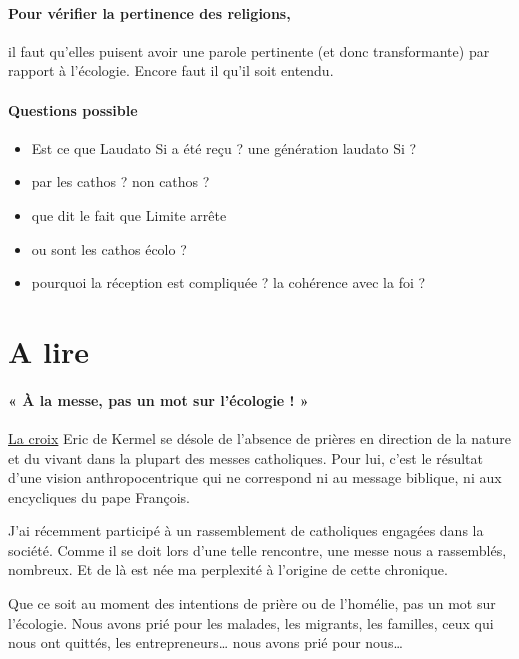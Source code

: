 \paragraph{Pour vérifier la pertinence des religions, } il faut qu'elles puisent avoir une parole pertinente (et donc transformante) par rapport à l'écologie. Encore faut il qu'il soit entendu.

\paragraph{Questions possible}
\begin{itemize}
    \item Est ce que Laudato Si a été reçu ? une génération laudato Si ?
    \item par les cathos ? non cathos ?
    \item que dit le fait que Limite arrête
    \item ou sont les cathos écolo ?
    \item pourquoi la réception est compliquée ? la cohérence avec la foi ? 
\end{itemize}



\section{A lire}

\paragraph{« À la messe, pas un mot sur l’écologie ! »}
\href{https://www.la-croix.com/Debats/A-messe-pas-mot-lecologie-2022-11-13-1201241840?utm_source=newsletter&utm_medium=email&utm_campaign=NEWSLETTER__CRX_REL_EDITO&utm_content=20221114}{La croix}
Eric de Kermel se désole de l’absence de prières en direction de la nature et du vivant dans la plupart des messes catholiques. Pour lui, c’est le résultat d’une vision anthropocentrique qui ne correspond ni au message biblique, ni aux encycliques du pape François.
 
 
J’ai récemment participé à un rassemblement de catholiques engagées dans la société. Comme il se doit lors d’une telle rencontre, une messe nous a rassemblés, nombreux. Et de là est née ma perplexité à l’origine de cette chronique.

Que ce soit au moment des intentions de prière ou de l’homélie, pas un mot sur l’écologie. Nous avons prié pour les malades, les migrants, les familles, ceux qui nous ont quittés, les entrepreneurs… nous avons prié pour nous…

